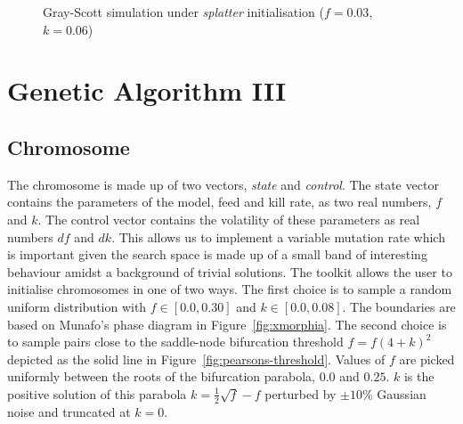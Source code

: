 \begin{figure}[!h]
            \hfill
            \caption{Gray-Scott simulation under \textit{splatter} initialisation ($f = 0.03$, $k = 0.06$)}
\label{fig:splatter}
\end{figure}

\section{Genetic Algorithm III} \label{sec:ga-3}

\subsection{Chromosome}
The chromosome is made up of two vectors, \textit{state} and \textit{control}. The state vector contains the parameters of the model, feed and kill rate, as two real numbers, $f$ and $k$. The control vector contains the volatility of these parameters as real numbers $df$ and $dk$. This allows us to implement a variable mutation rate which is important given the search space is made up of a small band of interesting behaviour amidst a background of trivial solutions. The toolkit allows the user to initialise chromosomes in one of two ways. The first choice is to sample a random uniform distribution with $f \in [0.0, 0.30]$ and $k \in [0.0, 0.08]$. The boundaries are based on Munafo's phase diagram in Figure~\ref{fig:xmorphia}. The second choice is to sample pairs close to the saddle-node bifurcation threshold $f = f(4+k)^2$ depicted as the solid line in Figure~\ref{fig:pearsons-threshold}. Values of $f$ are picked uniformly between the roots of the bifurcation parabola, $0.0$ and $0.25$. $k$ is the positive solution of this parabola $k = \frac{1}{2}\sqrt{f} - f$ perturbed by $\pm 10\%$ Gaussian noise and truncated at $k = 0$.

